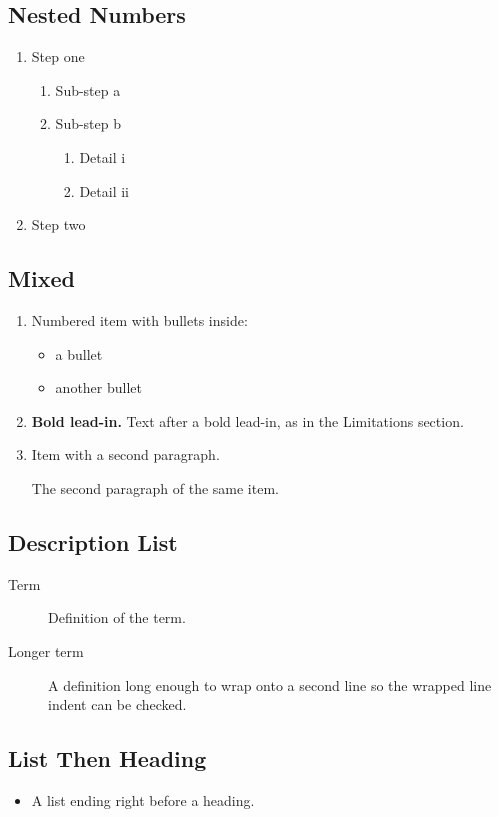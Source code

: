 \subsection{Nested Numbers}

\begin{enumerate}
  \item Step one
  \begin{enumerate}
    \item Sub-step a
    \item Sub-step b
    \begin{enumerate}
      \item Detail i
      \item Detail ii
    \end{enumerate}
  \end{enumerate}
  \item Step two
\end{enumerate}

\subsection{Mixed}

\begin{enumerate}
  \item Numbered item with bullets inside:
  \begin{itemize}
    \item a bullet
    \item another bullet
  \end{itemize}
  \item \textbf{Bold lead-in.} Text after a bold lead-in, as in the
        Limitations section.
  \item Item with a second paragraph.

        The second paragraph of the same item.
\end{enumerate}

\subsection{Description List}

\begin{description}
  \item[Term] Definition of the term.
  \item[Longer term] A definition long enough to wrap onto a second line so the
        wrapped line indent can be checked.
\end{description}
\subsection{List Then Heading}

\begin{itemize}
  \item A list ending right before a heading.
\end{itemize}
